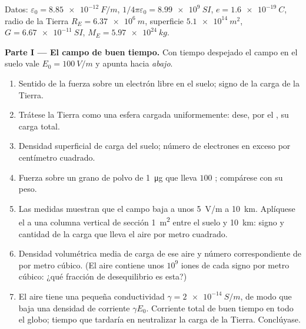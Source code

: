 \begin{problem}
\label{pb:b1:electrostatics-gauss:1}
Datos: $\varepsilon_0 = \qty{8.85e-12}{F/m}$, $1/4\pi\varepsilon_0 = \qty{8.99e9}{SI}$,
$e = \qty{1.6e-19}{C}$, radio de la Tierra $R_E = \qty{6.37e6}{m}$, superficie
$\qty{5.1e14}{m^2}$, $G = \qty{6.67e-11}{SI}$, $M_E = \qty{5.97e24}{kg}$.

\medskip
\noindent\textbf{Parte I --- El campo de buen tiempo.}
Con tiempo despejado el campo en el suelo vale $E_0 = \qty{100}{V/m}$ y
apunta hacia \emph{abajo}.
\begin{enumerate}
  \item Sentido de la fuerza sobre un electrón libre en el suelo; signo de
        la carga de la Tierra.
  \item Trátese la Tierra como una esfera cargada uniformemente: dese, por
        el , su carga total.
  \item Densidad superficial de carga del suelo; número de electrones en
        exceso por centímetro cuadrado.
  \item Fuerza sobre un grano de polvo de \qty{1}{\micro g} que lleva $100$
        ; compárese con su peso.
  \item Las medidas muestran que el campo baja a unos \qty{5}{V/m} a
        \qty{10}{km}. Aplíquese el  a una columna vertical
        de sección \qty{1}{m^2} entre el suelo y \qty{10}{km}: signo y
        cantidad de la carga que lleva el aire por metro cuadrado.
  \item Densidad volumétrica media de carga de ese aire y número
        correspondiente de  por metro cúbico. (El aire
        contiene unos $10^9$ iones de cada signo por metro cúbico: ¿qué
        fracción de desequilibrio es esta?)
  \item El aire tiene una pequeña conductividad $\gamma = \qty{2e-14}{S/m}$,
        de modo que baja una densidad de corriente $\gamma E_0$. Corriente
        total de buen tiempo en todo el globo; tiempo que tardaría en
        neutralizar la carga de la Tierra. Conclúyase.
\end{enumerate}


\end{problem}

